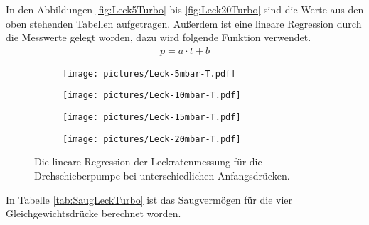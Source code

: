 In den Abbildungen \eqref{fig:Leck5Turbo} bis \eqref{fig:Leck20Turbo} sind die Werte aus den oben stehenden Tabellen aufgetragen. Außerdem ist eine lineare Regression durch die Messwerte gelegt worden, dazu wird folgende Funktion verwendet.
\begin{align}
  p = a \cdot t + b
\end{align}

\begin{figure}
  \begin{subfigure}[c]{0.49\textwidth}
    \texttt{[image: pictures/Leck-5mbar-T.pdf]}
    \label{fig:Leck5Turbo}
  \end{subfigure}\hfill
  \begin{subfigure}[c]{0.49\textwidth}
    \texttt{[image: pictures/Leck-10mbar-T.pdf]}
    \label{fig:Leck10Turbo}
  \end{subfigure}

  \begin{subfigure}[c]{0.49\textwidth}
    \texttt{[image: pictures/Leck-15mbar-T.pdf]}
    \label{fig:Leck15Turbo}
  \end{subfigure}\hfill
  \begin{subfigure}[c]{0.49\textwidth}
    \texttt{[image: pictures/Leck-20mbar-T.pdf]}
    \label{fig:Leck20Turbo}
  \end{subfigure}

  \caption{Die lineare Regression der Leckratenmessung für die Drehschieberpumpe bei unterschiedlichen Anfangsdrücken.}
\end{figure}

In Tabelle \eqref{tab:SaugLeckTurbo} ist das Saugvermögen für die vier Gleichgewichtsdrücke berechnet worden.

